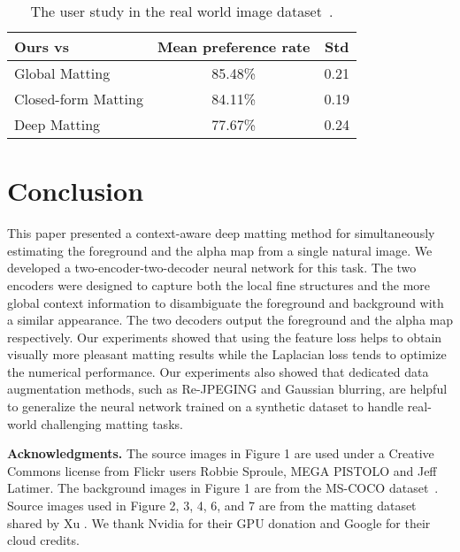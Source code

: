 \documentclass[10pt,twocolumn,letterpaper]{article}
\begin{document}
\begin{table}[t]
	\centering
	\caption{The user study in the real world image dataset~\cite{xu2017deep}.}
	\label{table:userstudy}
	\begin{tabular}{lcc}
			\hline
			 Ours vs &Mean preference rate & Std \\
			\hline

			Global Matting \cite{he2011global} & 85.48\%  &0.21  \\
			Closed-form Matting \cite{levin2008closed} & 84.11\% &0.19 \\
			Deep Matting \cite{xu2017deep} &77.67\%  &0.24 \\
			\hline
	\end{tabular}\vspace{-0.2in}
\end{table}


 

\section{Conclusion}

This paper presented a context-aware deep matting method for simultaneously estimating the foreground and the alpha map from a single natural image. We developed a two-encoder-two-decoder neural network for this task. The two encoders were designed to capture both the local fine structures and the more global context information to disambiguate the foreground and background with a similar appearance. The two decoders output the foreground and the alpha map respectively. Our experiments showed that using the feature loss helps to obtain visually more pleasant matting results while the Laplacian loss tends to optimize the numerical performance. Our experiments also showed that dedicated data augmentation methods, such as Re-JPEGING and Gaussian blurring, are helpful to generalize the neural network trained on a synthetic dataset to handle real-world challenging matting tasks.

\vspace{0.05in}
\noindent\textbf{Acknowledgments.}
The source images in Figure 1 are used under a Creative Commons license from Flickr users Robbie Sproule, MEGA PISTOLO and Jeff Latimer. The background images in Figure 1 are from the MS-COCO dataset~\cite{lin2014microsoft}. Source images used in Figure 2, 3, 4, 6, and 7 are from the matting dataset shared by Xu \etal\cite{xu2017deep}. We thank Nvidia for their GPU donation and Google for their cloud credits. 

{\small


}
\end{document}
